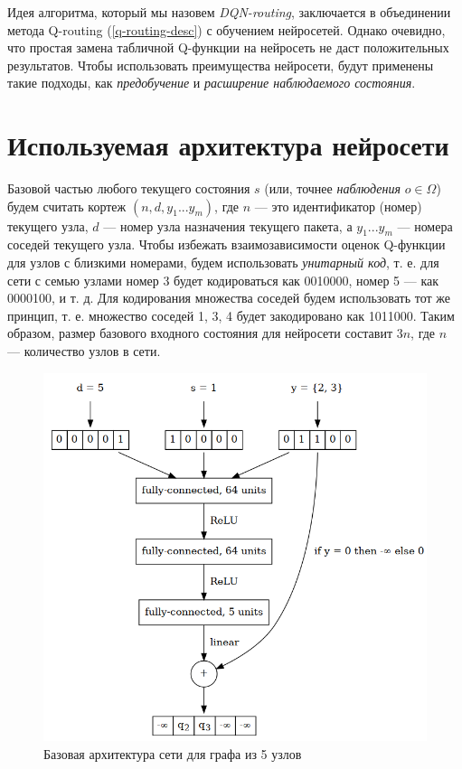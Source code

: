 \documentclass[specification, annotation]{itmo-student-thesis}
\begin{document}
Идея алгоритма, который мы назовем \textit{DQN-routing}, заключается в
объединении метода Q-routing (\ref{q-routing-desc}) с обучением нейросетей.
Однако очевидно, что простая замена табличной Q-функции на нейросеть не даст
положительных результатов. Чтобы использовать преимущества нейросети, будут
применены такие подходы, как \textit{предобучение} и \textit{расширение
  наблюдаемого состояния}.

\section{Используемая архитектура нейросети}

Базовой частью любого текущего состояния $s$ (или, точнее \textit{наблюдения}
$o \in \Omega$) будем считать кортеж $(n, d, y_1 ... y_m)$, где $n$ --- это
идентификатор (номер) текущего узла, $d$ --- номер узла назначения текущего
пакета, а $y_1 ... y_m$ --- номера соседей текущего узла. Чтобы избежать
взаимозависимости оценок Q-функции для узлов с близкими номерами, будем
использовать \textit{унитарный код}, т. е. для сети с семью узлами номер 3 будет
кодироваться как 0010000, номер 5 --- как 0000100, и т. д. Для кодирования
множества соседей будем использовать тот же принцип, т. е. множество соседей 1,
3, 4 будет закодировано как 1011000. Таким образом, размер базового входного
состояния для нейросети составит $3n$, где $n$ --- количество узлов в сети.

\begin{figure}[!h]
  \caption{Базовая архитектура сети для графа из 5 узлов}\label{nn-pic-1}
  \centering
  \includegraphics[scale=0.5]{nn-1}
\end{figure}
\end{document}
